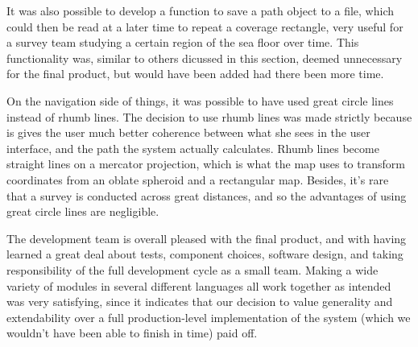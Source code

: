 It was also possible to develop a function to save a path object to a file, which could then be read at a later time to repeat a coverage rectangle, very useful for a survey team studying a certain region of the sea floor over time. This functionality was, similar to others dicussed in this section, deemed unnecessary for the final product, but would have been added had there been more time.

On the navigation side of things, it was possible to have used great circle lines instead of rhumb lines. The decision to use rhumb lines was made strictly because is gives the user much better coherence between what she sees in the user interface, and the path the system actually calculates. Rhumb lines become straight lines on a mercator projection, which is what the map uses to transform coordinates from an oblate spheroid and a rectangular map. Besides, it's rare that a survey is conducted across great distances, and so the advantages of using great circle lines are negligible.

The development team is overall pleased with the final product, and with having learned a great deal about tests, component choices, software design, and taking responsibility of the full development cycle as a small team. Making a wide variety of modules in several different languages all work together as intended was very satisfying, since it indicates that our decision to value generality and extendability over a full production-level implementation of the system (which we wouldn't have been able to finish in time) paid off.
